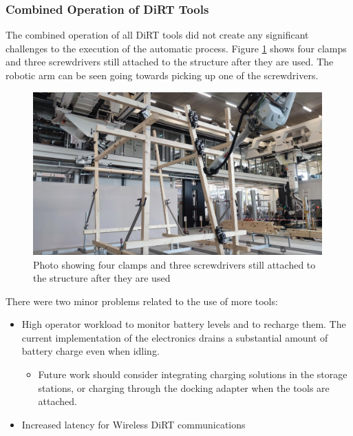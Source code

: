 \subsubsection{Combined Operation of DiRT Tools}
\label{subsubsection:exploration-5-combined-operation-of-dirt-tools}

The combined operation of all DiRT tools did not create any significant challenges to the execution of the automatic process. Figure \ref{fig:photo-clamps-and-screwdrivers-3} shows four clamps and three screwdrivers still attached to the structure after they are used. The robotic arm can be seen going towards picking up one of the screwdrivers.

\begin{figure}[!h]
    \centering
    \includegraphics[width=0.99\textwidth]{images/08/img34.jpg}
    \caption{Photo showing four clamps and three screwdrivers still attached to the structure after they are used}
    \label{fig:photo-clamps-and-screwdrivers-3}
\end{figure}

There were two minor problems related to the use of more tools:

\begin{itemize}
	\item High operator workload to monitor battery levels and to recharge them. The current implementation of the electronics drains a substantial amount of battery charge even when idling.

    \begin{itemize}
        \item Future work should consider integrating charging solutions in the storage stations, or charging through the docking adapter when the tools are attached.

    \end{itemize}
	\item Increased latency for Wireless DiRT communications 

\end{itemize}

